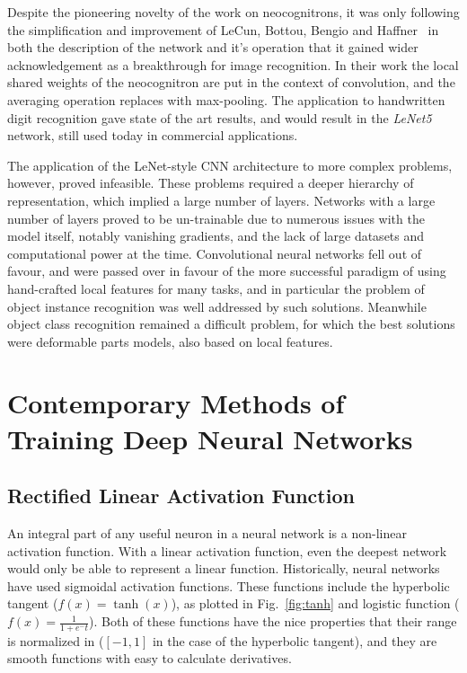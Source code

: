 \documentclass[thesis]{subfiles}
\begin{document}
Despite the pioneering novelty of the work on neocognitrons, it was only following the simplification and improvement  of LeCun, Bottou, Bengio and Haffner~\cite{Lecun1998} in both the description of the network and it's operation that it gained wider acknowledgement as a breakthrough for image recognition. In their work the local shared weights of the neocognitron are put in the context of convolution, and the averaging operation replaces with max-pooling. The application to handwritten digit recognition gave state of the art results, and would result in the \emph{LeNet5} network, still used today in commercial applications. 

The application of the LeNet-style CNN architecture to more complex problems, however, proved infeasible. These problems required a deeper hierarchy of representation, which implied a large number of layers. Networks with a large number of layers proved to be un-trainable due to numerous issues with the model itself, notably vanishing gradients, and the lack of large datasets and computational power at the time. Convolutional neural networks fell out of favour, and were passed over in favour of the more successful paradigm of using hand-crafted local features for many tasks, and in particular the problem of object instance recognition was well addressed by such solutions. Meanwhile object class recognition remained a difficult problem, for which the best solutions were deformable parts models, also based on local features.

\section{Contemporary Methods of Training Deep Neural Networks}
\subsection{Rectified Linear Activation Function}
An integral part of any useful neuron in a neural network is a non-linear activation function. With a linear activation function, even the deepest network would only be able to represent a linear function. Historically, neural networks have used sigmoidal activation functions. These functions include the hyperbolic tangent ($f(x) = \tanh(x)$), as plotted in Fig.~\ref{fig:tanh} and logistic function ($f(x) = \frac{1}{1+e^-t}$). Both of these functions have the nice properties that their range is normalized in ($[-1,1]$ in the case of the hyperbolic tangent), and they are smooth functions with easy to calculate derivatives.
\end{document}
